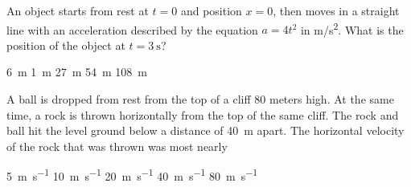 \documentclass{../../../oss-classkick-exam}
\begin{document}
\begin{multicols*}{2}
\begin{questions}
    \question An object starts from rest at $t=0$ and position $x=0$, then moves
    in a straight line with an acceleration described by the equation $a=4t^2$
    in \si{m/s^2}. What is the position of the object at $t=\SI{3}{\second}$?
    \begin{choices}
      \choice\SI{6}{\metre}
      \choice\SI{1}{\metre}
      \choice\SI{27}{\metre}
      \choice\SI{54}{\metre}
      \choice\SI{108}{\metre}
    \end{choices}
  
    \question A ball is dropped from rest from the top of a cliff $80$ meters
    high. At the same time, a rock is thrown horizontally from the top of the
    same cliff. The rock and ball hit the level ground below a distance of
    \SI{40}{\metre} apart. The horizontal velocity of the rock that was thrown
    was most nearly
    \begin{center}
      \vspace{-.15in}
    \end{center}
    \begin{choices}
      \choice\SI{5}{\metre\per\second}
      \choice\SI{10}{\metre\per\second}
      \choice\SI{20}{\metre\per\second}
      \choice\SI{40}{\metre\per\second}
      \choice\SI{80}{\metre\per\second}
    \end{choices}
    
%    
      

\end{questions}
\end{multicols*}
\end{document}
